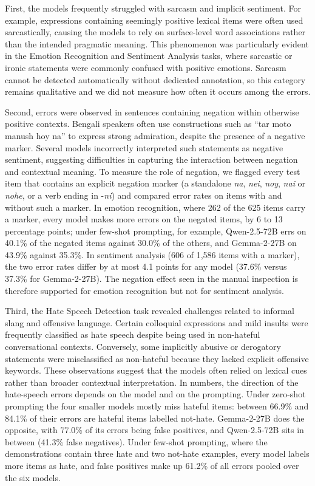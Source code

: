 \documentclass[10pt,letterpaper]{article}
\newcommand{\banglaNegationExample}{tar moto manush hoy na}
\newcommand{\bn}[2]{\textit{#2}}
\newcommand{\banglaNegationExample}{{\bengalifont তার মতো মানুষ হয় না}}
\newcommand{\bn}[2]{{\bengalifont #1}}
\begin{document}
First, the models frequently struggled with sarcasm and implicit sentiment. For example, expressions containing seemingly positive lexical items were often used sarcastically, causing the models to rely on surface-level word associations rather than the intended pragmatic meaning. This phenomenon was particularly evident in the Emotion Recognition and Sentiment Analysis tasks, where sarcastic or ironic statements were commonly confused with positive emotions. Sarcasm cannot be detected automatically without dedicated annotation, so this category remains qualitative and we did not measure how often it occurs among the errors.

Second, errors were observed in sentences containing negation within otherwise positive contexts. Bengali speakers often use constructions such as ``\banglaNegationExample'' to express strong admiration, despite the presence of a negative marker. Several models incorrectly interpreted such statements as negative sentiment, suggesting difficulties in capturing the interaction between negation and contextual meaning. To measure the role of negation, we flagged every test item that contains an explicit negation marker (a standalone \bn{না}{na}, \bn{নেই}{nei}, \bn{নয়}{noy}, \bn{নাই}{nai} or \bn{নহে}{nohe}, or a verb ending in -\bn{নি}{ni}) and compared error rates on items with and without such a marker. In emotion recognition, where 262 of the 625 items carry a marker, every model makes more errors on the negated items, by 6 to 13 percentage points; under few-shot prompting, for example, Qwen-2.5-72B errs on 40.1\% of the negated items against 30.0\% of the others, and Gemma-2-27B on 43.9\% against 35.3\%. In sentiment analysis (606 of 1,586 items with a marker), the two error rates differ by at most 4.1 points for any model (37.6\% versus 37.3\% for Gemma-2-27B). The negation effect seen in the manual inspection is therefore supported for emotion recognition but not for sentiment analysis.

Third, the Hate Speech Detection task revealed challenges related to informal slang and offensive language. Certain colloquial expressions and mild insults were frequently classified as hate speech despite being used in non-hateful conversational contexts. Conversely, some implicitly abusive or derogatory statements were misclassified as non-hateful because they lacked explicit offensive keywords. These observations suggest that the models often relied on lexical cues rather than broader contextual interpretation. In numbers, the direction of the hate-speech errors depends on the model and on the prompting. Under zero-shot prompting the four smaller models mostly miss hateful items: between 66.9\% and 84.1\% of their errors are hateful items labelled not-hate. Gemma-2-27B does the opposite, with 77.0\% of its errors being false positives, and Qwen-2.5-72B sits in between (41.3\% false negatives). Under few-shot prompting, where the demonstrations contain three hate and two not-hate examples, every model labels more items as hate, and false positives make up 61.2\% of all errors pooled over the six models.
\end{document}

